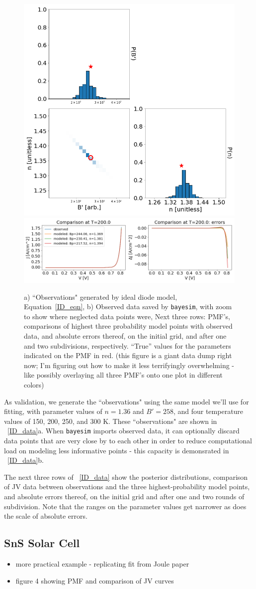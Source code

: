\documentclass[aps,prl,amsmath,amssymb,superscriptaddress,notitlepage,groupedaddress]{revtex4-1}
\begin{document}
\begin{figure}
      \includegraphics[width=0.3\columnwidth]{diode_pmf_3.png}
      \includegraphics[width=0.65\columnwidth]{diode_comp_3.png}
      \caption{a) ``Observations" generated by ideal diode model, Equation~\ref{ID_eqn}, b) Observed data saved by \texttt{bayesim}, with zoom to show where neglected data points were, Next three rows: PMF's, comparisons of highest three probability model points with observed data, and absolute errors thereof, on the initial grid, and after one and two subdivisions, respectively. ``True'' values for the parameters indicated on the PMF in red. (this figure is a giant data dump right now; I'm figuring out how to make it less terrifyingly overwhelming - like possibly overlaying all three PMF's onto one plot in different colors)}
      \label{ID_data}
    \end{figure}

    As validation, we generate the ``observations" using the same model we'll use for fitting, with parameter values of $n=1.36$ and $B'=258$, and four temperature values of 150, 200, 250, and 300 K. These ``observations" are shown in ~\autoref{ID_data}a. When \texttt{bayesim} imports observed data, it can optionally discard data points that are very close by to each other in order to reduce computational load on modeling less informative points - this capacity is demonsrated in ~\autoref{ID_data}b.

    The next three rows of ~\autoref{ID_data} show the posterior distributions, comparison of JV data between observations and the three highest-probability model points, and absolute errors thereof, on the initial grid and after one and two rounds of subdivision. Note that the ranges on the parameter values get narrower as does the scale of absolute errors.

  \subsection{SnS Solar Cell}
    \begin{itemize}
      \item more practical example - replicating fit from Joule paper
      \item figure 4 showing PMF and comparison of JV curves
    \end{itemize}
\end{document}
